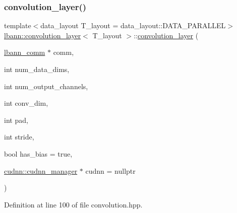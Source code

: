 \subsubsection{\texorpdfstring{convolution\+\_\+layer()}{convolution\_layer()}\hspace{0.1cm}{\footnotesize\ttfamily [1/2]}}
{\footnotesize\ttfamily template$<$data\+\_\+layout T\+\_\+layout = data\+\_\+layout\+::\+D\+A\+T\+A\+\_\+\+P\+A\+R\+A\+L\+L\+EL$>$ \\
\hyperlink{classlbann_1_1convolution__layer}{lbann\+::convolution\+\_\+layer}$<$ T\+\_\+layout $>$\+::\hyperlink{classlbann_1_1convolution__layer}{convolution\+\_\+layer} (\begin{DoxyParamCaption}\item[{\hyperlink{classlbann_1_1lbann__comm}{lbann\+\_\+comm} $\ast$}]{comm,  }\item[{int}]{num\+\_\+data\+\_\+dims,  }\item[{int}]{num\+\_\+output\+\_\+channels,  }\item[{int}]{conv\+\_\+dim,  }\item[{int}]{pad,  }\item[{int}]{stride,  }\item[{bool}]{has\+\_\+bias = {\ttfamily true},  }\item[{\hyperlink{classlbann_1_1cudnn_1_1cudnn__manager}{cudnn\+::cudnn\+\_\+manager} $\ast$}]{cudnn = {\ttfamily nullptr} }\end{DoxyParamCaption})\hspace{0.3cm}{\ttfamily [inline]}}



Definition at line 100 of file convolution.\+hpp.


